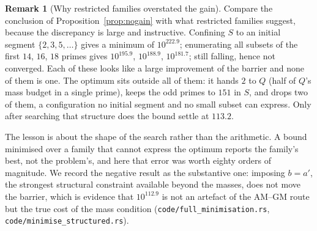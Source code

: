 \documentclass[11pt]{article}
\theoremstyle{definition}
\newtheorem{remark}[theorem]{Remark}
\begin{document}
\begin{remark}[Why restricted families overstated the gain]\label{rem:sectorsquared}
Compare the conclusion of Proposition~\ref{prop:nogain} with what restricted families
suggest, because the discrepancy is large and instructive. Confining $S$ to an initial segment
$\{2,3,5,\dots\}$ gives a minimum of $10^{222.9}$; enumerating all subsets of the first $14$, $16$,
$18$ primes gives $10^{195.9}$, $10^{188.9}$, $10^{181.7}$; still falling, hence not converged.
Each of these looks like a large improvement of the barrier and none of them is one. The optimum sits
outside all of them: it hands $2$ to $Q$ (half of $Q$'s mass budget in a single prime), keeps the odd
primes to $151$ in $S$, and drops two of them, a configuration no initial segment and no small subset
can express. Only after searching that structure does the bound settle at $113.2$.

The lesson is about the shape of the search rather than the arithmetic. A bound minimised over a
family that cannot express the optimum reports the family's best, not the problem's, and here that
error was worth eighty orders of magnitude. We record the negative result as the substantive one:
imposing $b=a'$, the strongest structural constraint available beyond the masses, does not move the
barrier, which is evidence that $10^{112.9}$ is not an artefact of the AM--GM route but the true
cost of the mass condition (\texttt{code/full\_minimisation.rs},
\texttt{code/minimise\_structured.rs}).
\end{remark}
\end{document}
